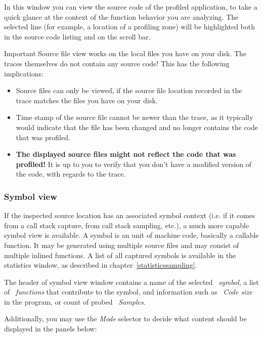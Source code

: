 \documentclass[hidelinks,titlepage,a4paper]{article}
\begin{document}
In this window you can view the source code of the profiled application, to take a quick glance at the context of the function behavior you are analyzing. The selected line (for example, a location of a profiling zone) will be highlighted both in the source code listing and on the scroll bar.

\begin{bclogo}[
noborder=true,
couleur=black!5,
logo=\bcbombe
]{Important}
Source file view works on the local files you have on your disk. The traces themselves do not contain any source code! This has the following implications:

\begin{itemize}
\item Source files can only be viewed, if the source file location recorded in the trace matches the files you have on your disk.
\item Time stamp of the source file cannot be newer than the trace, as it typically would indicate that the file has been changed and no longer contains the code that was profiled.
\item \textbf{The displayed source files might not reflect the code that was profiled!} It is up to you to verify that you don't have a modified version of the code, with regards to the trace.
\end{itemize}
\end{bclogo}

\subsubsection{Symbol view}

If the inspected source location has an associated symbol context (i.e. if it comes from a call stack capture, from call stack sampling, etc.), a much more capable symbol view is available. A symbol is an unit of machine code, basically a callable function. It may be generated using multiple source files and may consist of multiple inlined functions. A list of all captured symbols is available in the statistics window, as described in chapter~\ref{statisticssampling}.

The header of symbol view window contains a name of the selected \emph{\faPuzzlePiece{}~symbol}, a list of \emph{\faSitemap{}~functions} that contribute to the symbol, and information such as \emph{\faWeightHanging{}~Code size} in the program, or count of probed \emph{\faEyeDropper{}~Samples}.

Additionally, you may use the \emph{Mode} selector to decide what content should be displayed in the panels below:
\end{document}
